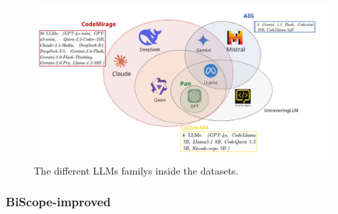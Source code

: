 \begin{figure}[H]
    \centering
    \includegraphics[width=1\textwidth]{img/1/Untitled - LLM over dataset.jpg}
    \caption{The different LLMs familys inside the datasets.}
    \label{fig:LLMOverDataset}
\end{figure}



\subsubsection{BiScope-improved}

